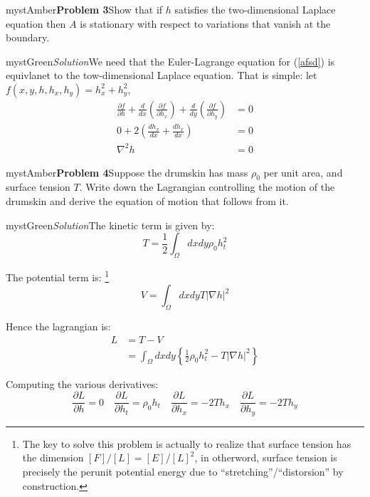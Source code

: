 \begin{mystadmonition}{mystAmber}{\textbf{Problem 3}}Show that if $h$ satisfies the two-dimensional Laplace equation then $A$ is stationary with
respect to variations that vanish at the boundary.

\end{mystadmonition}
\begin{mystadmonition}{mystGreen}{\emph{Solution}}We need that the Euler-Lagrange equation for (\ref{afsd}) is equivlanet to the tow-dimensional Laplace equation. That is simple: let $f(x,y,h, h_x,h_y)=h_x^2 + h_y^2$,
\begin{equation}
\begin{aligned}
\frac{\partial f}{\partial h} + \frac{d}{dx}\left(\frac{\partial f}{\partial h_x}\right) + \frac{d}{dy}\left(\frac{\partial f}{\partial h_y}\right) &= 0 \\
 0 + 2\left(\frac{dh_x}{dx} +  \frac{dh_x}{dx}\right) &= 0\\
 \nabla^2 h &=0
\end{aligned}
\end{equation}

\end{mystadmonition}
\begin{mystadmonition}{mystAmber}{\textbf{Problem 4}}Suppose the drumskin has mass $\rho_0$ per unit area, and surface tension $T$. Write down
the Lagrangian controlling the motion of the drumskin and derive the equation of
motion that follows from it.

\end{mystadmonition}
\begin{mystadmonition}{mystGreen}{\emph{Solution}}The kinetic term is given by:
\begin{equation}
T=\frac12 \int_{\Omega} dxdy \rho_0h_t^2
\end{equation}

The potential term is: \footnote{The key to solve this problem is actually to realize that surface tension has the dimension $[F]/[L]=[E]/[L]^2$, in otherword, surface tension is precisely the perunit potential energy due to ``stretching''/``distorsion'' by construction.}
\begin{equation}
V=\int_{\Omega} dxdy T|\nabla h|^2
\end{equation}

Hence the lagrangian is:
\begin{equation}
\begin{aligned}
L &= T-V \\
&= \int_{\Omega} dxdy \left\{\frac12 \rho_0h_t^2 - T|\nabla h|^2 \right\}
\end{aligned}
\end{equation}

Computing the various derivatives:
\begin{equation}
\frac{\partial L}{\partial h}=0 \quad \frac{\partial L}{\partial h_t}=\rho_0 h_t \quad \frac{\partial L}{\partial h_x}=-2Th_{x} \quad \frac{\partial L}{\partial h_y}=-2Th_{y}
\end{equation}

\end{mystadmonition}